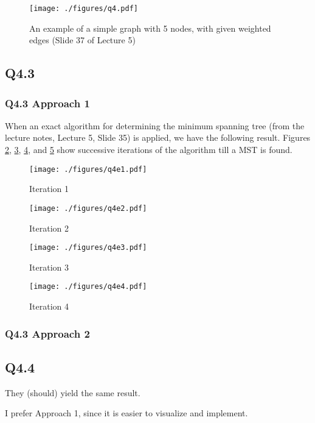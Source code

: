 \documentclass[letter,12pt]{article}
\begin{document}
\begin{figure}
\centering 
\texttt{[image: ./figures/q4.pdf]}
\caption{An example of a simple graph with 5 nodes, with given weighted edges (Slide 37 of Lecture 5)}
\label{fig:q4example}
\end{figure}

\subsection{Q4.3}
\label{ssec:q4d3}

\subsubsection{Q4.3 Approach 1}
\label{sssec:q4d3p1}

When an exact algorithm for determining the minimum spanning tree (from the lecture notes, Lecture 5, Slide 35) is applied, we have the following result. Figures \ref{fig:q4example1}, \ref{fig:q4example2}, \ref{fig:q4example3}, and \ref{fig:q4example4} show successive iterations of the algorithm till a MST is found.


\begin{figure}
\centering 
\texttt{[image: ./figures/q4e1.pdf]}
\caption{Iteration 1}
\label{fig:q4example1}
\end{figure}

\begin{figure}
\centering 
\texttt{[image: ./figures/q4e2.pdf]}
\caption{Iteration 2}
\label{fig:q4example2}
\end{figure}

\begin{figure}
\centering 
\texttt{[image: ./figures/q4e3.pdf]}
\caption{Iteration 3}
\label{fig:q4example3}
\end{figure}

\begin{figure}
\centering 
\texttt{[image: ./figures/q4e4.pdf]}
\caption{Iteration 4}
\label{fig:q4example4}
\end{figure}


\subsubsection{Q4.3 Approach 2}
\label{sssec:q4d3p2}



\subsection{Q4.4}
\label{sssec:q4d4}

They (should) yield the same result.

I prefer Approach 1, since it is easier to visualize and implement.

\newpage
{\linespread{1}


}
\end{document}
